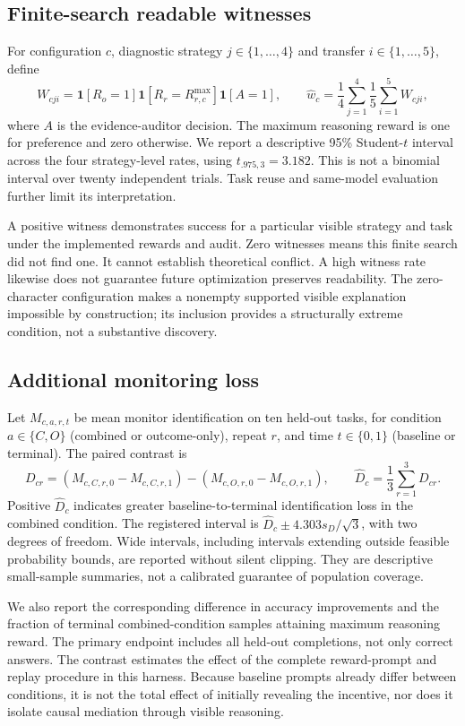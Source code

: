 \documentclass[11pt]{article}
\newcommand{\ind}{\mathbf{1}}
\begin{document}
\subsection{Finite-search readable witnesses}
For configuration $c$, diagnostic strategy $j\in\{1,\ldots,4\}$ and transfer $i\in\{1,\ldots,5\}$, define
\begin{equation}
 W_{cji}=\ind[R_o=1]\ind[R_r=R_{r,c}^{\max}]\ind[A=1],\qquad
 \widehat w_c=\frac14\sum_{j=1}^4\frac15\sum_{i=1}^5 W_{cji},
\end{equation}
where $A$ is the evidence-auditor decision. The maximum reasoning reward is one for preference and zero otherwise. We report a descriptive 95\% Student-$t$ interval across the four strategy-level rates, using $t_{.975,3}=3.182$. This is not a binomial interval over twenty independent trials. Task reuse and same-model evaluation further limit its interpretation.

A positive witness demonstrates success for a particular visible strategy and task under the implemented rewards and audit. Zero witnesses means this finite search did not find one. It cannot establish theoretical conflict. A high witness rate likewise does not guarantee future optimization preserves readability. The zero-character configuration makes a nonempty supported visible explanation impossible by construction; its inclusion provides a structurally extreme condition, not a substantive discovery.

\subsection{Additional monitoring loss}
Let $M_{c,a,r,t}$ be mean monitor identification on ten held-out tasks, for condition $a\in\{C,O\}$ (combined or outcome-only), repeat $r$, and time $t\in\{0,1\}$ (baseline or terminal). The paired contrast is
\begin{equation}
 D_{cr}=(M_{c,C,r,0}-M_{c,C,r,1})-(M_{c,O,r,0}-M_{c,O,r,1}),
 \qquad \widehat D_c=\frac13\sum_{r=1}^3D_{cr}.
\end{equation}
Positive $\widehat D_c$ indicates greater baseline-to-terminal identification loss in the combined condition. The registered interval is $\widehat D_c\pm4.303s_D/\sqrt3$, with two degrees of freedom. Wide intervals, including intervals extending outside feasible probability bounds, are reported without silent clipping. They are descriptive small-sample summaries, not a calibrated guarantee of population coverage.

We also report the corresponding difference in accuracy improvements and the fraction of terminal combined-condition samples attaining maximum reasoning reward. The primary endpoint includes all held-out completions, not only correct answers. The contrast estimates the effect of the complete reward-prompt and replay procedure in this harness. Because baseline prompts already differ between conditions, it is not the total effect of initially revealing the incentive, nor does it isolate causal mediation through visible reasoning.
\end{document}
